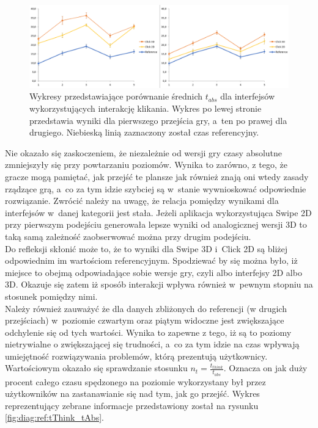 \documentclass[a4paper,12pt,numbers=noenddot]{report}
\begin{document}
\begin{figure}[h!]
	\centering
  	\includegraphics[width=\linewidth]{diag/tAbs_Click12.png}
	\caption{Wykresy przedstawiające porównanie średnich $t_{abs}$ dla interfejsów wykorzystujących interakcję klikania. Wykres po lewej stronie przedstawia wyniki dla pierwszego przejścia gry, a~ten po prawej dla drugiego. Niebieską linią zaznaczony został czas referencyjny.}
	\label{fig:diag:tAbs_Click12}
\end{figure}

Nie okazało się zaskoczeniem, że niezależnie od wersji gry czasy absolutne zmniejszyły się przy powtarzaniu poziomów. Wynika to zarówno, z tego, że gracze mogą pamiętać, jak przejść te plansze jak również znają oni wtedy zasady rządzące grą, a~co za tym idzie szybciej są w~stanie wywnioskować odpowiednie rozwiązanie. Zwrócić należy na uwagę, że relacja pomiędzy wynikami dla interfejsów w~danej kategorii jest stała. Jeżeli aplikacja wykorzystująca Swipe 2D przy pierwszym podejściu generowała lepsze wyniki od analogicznej wersji 3D to taką samą zależność zaobserwować można przy drugim podejściu.\\
Do refleksji skłonić może to, że to wyniki dla Swipe 3D i~Click 2D są bliżej odpowiednim im wartościom referencyjnym. Spodziewać by się można było, iż miejsce to obejmą odpowiadające sobie wersje gry, czyli albo interfejsy 2D albo 3D. Okazuje się zatem iż sposób interakcji wpływa również w~pewnym stopniu na stosunek pomiędzy nimi. \\
Należy również zauważyć że dla danych zbliżonych do referencji (w drugich przejściach) w~poziomie czwartym oraz piątym widoczne jest zwiększające odchylenie się od tych wartości. Wynika to zapewne z tego, iż są to poziomy nietrywialne o zwiększającej się trudności, a~co za tym idzie na czas wpływają umiejętność rozwiązywania problemów, którą prezentują użytkownicy.\\

Wartościowym okazało się sprawdzanie stosunku $n_{t} = \frac{t_{think}}{t_{abs}}$. Oznacza on jak duży procent całego czasu spędzonego na poziomie wykorzystany był przez użytkowników na zastanawianie się nad tym, jak go przejść. Wykres reprezentujący zebrane informacje przedstawiony został na rysunku \ref{fig:diag:ref:tThink_tAbs}.
\end{document}
